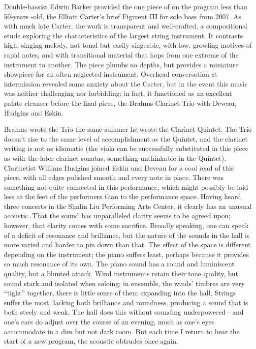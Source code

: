 Double-bassist Edwin Barker provided the one piece of on the program less than 50-years -old, the Elliott Carter’s brief Figment III for solo bass from 2007. As with much late Carter, the work is transparent and well-crafted, a compositional etude exploring the characteristics of the largest string instrument. It contrasts high, singing melody, not tonal but easily singeable, with low, growling motives of rapid notes, and with transitional material that hops from one extreme of the instrument to another. The piece plumbs no depths, but provides a miniature showpiece for an often neglected instrument. Overhead conversation at intermission revealed some anxiety about the Carter, but in the event this music was neither challenging nor forbidding; in fact, it functioned as an excellent palate cleanser before the final piece, the Brahms Clarinet Trio with Deveau, Hudgins and Eskin.

Brahms wrote the Trio the same summer he wrote the Clarinet Quintet. The Trio doesn't rise to the same level of accomplishment as the Quintet, and the clarinet writing is not as idiomatic (the viola can be successfully substituted in this piece as with the later clarinet sonatas, something unthinkable in the Quintet). Clarinetist William Hudgins joined Eskin and Deveau for a cool read of this piece, with all edges polished smooth and every note in place. There was something not quite connected in this performance, which might possibly be laid less at the feet of the performers than to the performance space. Having heard three concerts in the Shalin Liu Performing Arts Center, it clearly has an unusual acoustic. That the sound has unparalleled clarity seems to be agreed upon; however, that clarity comes with some sacrifice. Broadly speaking, one can speak of a deficit of resonance and brilliance, but the nature of the sounds in the hall is more varied and harder to pin down than that. The effect of the space is different depending on the instrument; the piano suffers least, perhaps because it provides so much resonance of its own. The piano sound has a round and luminiscent quality, but a blunted attack. Wind instruments retain their tone quality, but sound stark and isolated when soloing; in ensemble, the winds’ timbres are very “tight” together, there is little sense of them expanding into the hall. Strings suffer the most, lacking both brilliance and roundness, producing a sound that is both steely and weak. The hall does this without sounding underpowered—and one's ears do adjust over the course of an evening, much as one’s eyes accommodate in a dim but not dark room. But each time I return to hear the start of a new program, the acoustic obtrudes once again.

